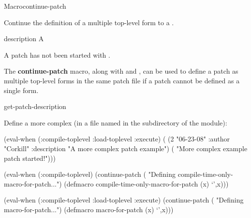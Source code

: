 \documentclass[10pt,twoside,english,pdftex]{article}
\begin{document}

\begin{functiondoc}{Macro}{continue-patch}{\superstar}
%
%

\fnsyntax 

\fnpurpose Continue the definition of a multiple top-level form  to
a .

\fnpackage {}

\fnmodule {}

\fnargs
\begin{args}{description}
\arg[form] A 
\end{args}

\fnerrors
A patch has not been started with \textbf{}.

\fndescription 
%
The \textbf{continue-patch} macro, along with \textbf{}
and \textbf{}, can be used to define a patch as multiple
top-level forms in the same patch file if a patch cannot be defined as a
single \textbf{} form.

\begin{alsos}{get-patch-description}
\also[patch]
\also[undefmethod]
\end{alsos}

\fnexample 
%
Define a more complex  (in a file named 
in the  subdirectory of the module):
%
%
%
%
%
\W\supp
\begin{example}
  (eval-when (:compile-toplevel :load-toplevel :execute)
    ( (2 "06-23-08" 
                    :author "Corkill"
                    :description "A more complex patch example")
        ( "More complex example patch started!")))

  (eval-when (:compile-toplevel)
    (continue-patch
     ( "Defining compile-time-only-macro-for-patch...")
     (defmacro compile-time-only-macro-for-patch (x)
       `',x)))

  (eval-when (:compile-toplevel :load-toplevel :execute)
    (continue-patch
     ( "Defining macro-for-patch...")
     (defmacro macro-for-patch (x)
       `',x)))\goodpagebreak


\end{example}
\end{functiondoc}
\end{document}
